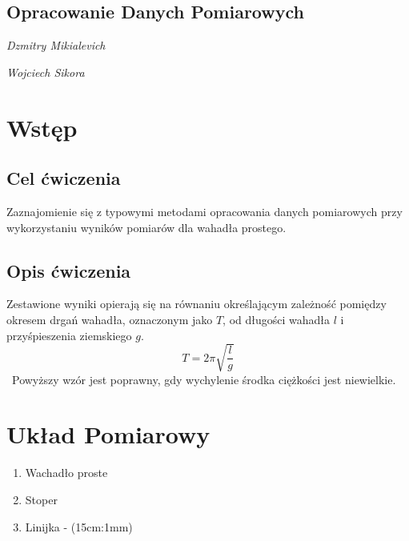 \documentclass[18pt, twoside]{article}
\begin{document}
\begin{figure}[tp!]
\end{figure}

\begin{center}
	\section*{Opracowanie Danych Pomiarowych}
	\emph{Dzmitry Mikialevich}
\end{center}
\begin{center}
	\emph{Wojciech Sikora}
\end{center}
\tableofcontents
\newpage

\section{Wstęp}

\subsection{Cel ćwiczenia}
Zaznajomienie się z typowymi metodami opracowania danych pomiarowych
przy wykorzystaniu wyników pomiarów dla wahadła prostego. 
    
\subsection{Opis ćwiczenia}
Zestawione wyniki opierają się na równaniu określającym zależność pomiędzy okresem drgań wahadła, oznaczonym jako \(T\), od długości wahadła \(l\) i przyśpieszenia ziemskiego \(g\).
\[T = 2\pi \sqrt{\frac{l}{g}}\] \
Powyższy wzór jest poprawny, gdy wychylenie środka ciężkości jest niewielkie.
    
\section{Układ Pomiarowy}



\begin{enumerate}
	\item Wachadło proste
	\item Stoper
	\item Linijka - (15cm:1mm)
\end{enumerate}
\end{document}
